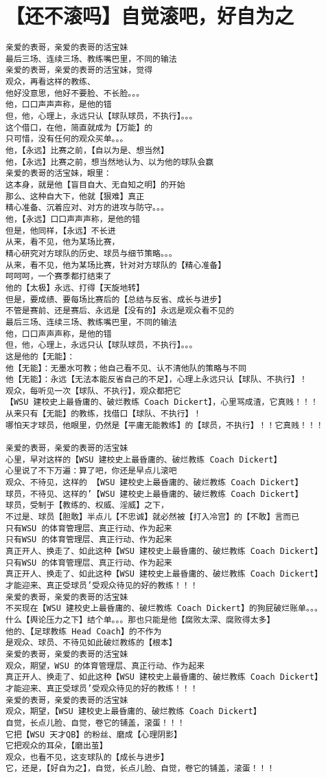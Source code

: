 \documentclass[9pt, b5paper]{article}
\begin{document}
\section{【还不滚吗】自觉滚吧，好自为之}
\label{sec-15}
\begin{verbatim}
亲爱的表哥，亲爱的表哥的活宝妹
最后三场、连续三场、教练嘴巴里，不同的输法
亲爱的表哥，亲爱的表哥的活宝妹，觉得
观众，再看这样的教练、
他好没意思，他好不要脸、不长脸。。。
他，口口声声声称，是他的错
但，他，心理上，永远只认【球队球员，不执行】。。。
这个借口，在他，简直就成为【万能】的
只可惜，没有任何的观众买单。。。
他，【永远】比赛之前，【自以为是、想当然】
他，【永远】比赛之前，想当然地认为、以为他的球队会赢
亲爱的表哥的活宝妹，眼里：
这本身，就是他【盲目自大、无自知之明】的开始
那么、这种自大下，他就【狠难】真正
精心准备、沉着应对、对方的进攻与防守。。。
他，【永远】口口声声声称，是他的错
但是，他同样，【永远】不长进
从来，看不见，他为某场比赛，
精心研究对方球队的历史、球员与细节策略。。。
从来，看不见，他为某场比赛，针对对方球队的【精心准备】
呵呵呵，一个赛季都打结束了
他的【太极】永远、打得【天旋地转】
但是，要成绩、要每场比赛后的【总结与反省、成长与进步】
不管是赛前、还是赛后、永远是【没有的】永远是观众看不见的
最后三场、连续三场、教练嘴巴里，不同的输法
他，口口声声声称，是他的错
但，他，心理上，永远只认【球队球员，不执行】。。。
这是他的【无能】：
他【无能】：无墨水可教；他自己看不见、认不清他队的策略与不同
他【无能】：永远【无法本能反省自己的不足】，心理上永远只认【球队、不执行】！
观众，每听见一次【球队、不执行】，观众都把它
【WSU 建校史上最昏庸的、破烂教练 Coach Dickert】，心里骂成渣，它真贱！！！
从来只有【无能】的教练，找借口【球队、不执行】！
哪怕天才球员，他眼里，仍然是【平庸无能教练】的【球员，不执行】！！它真贱！！！

亲爱的表哥，亲爱的表哥的活宝妹
心里，早对这样的【WSU 建校史上最昏庸的、破烂教练 Coach Dickert】
心里说了不下万遍：算了吧，你还是早点儿滚吧
观众、不待见，这样的 【WSU 建校史上最昏庸的、破烂教练 Coach Dickert】
球员，不待见、这样的’【WSU 建校史上最昏庸的、破烂教练 Coach Dickert】
球员，受制于【教练的、权威、淫威】之下，
不过是、球员【胆敢】半点儿【不忠诚】就必然被【打入冷宫】的【不敢】言而已
只有WSU 的体育管理层、真正行动、作为起来
只有WSU 的体育管理层、真正行动、作为起来
真正开人、换走了、如此这种【WSU 建校史上最昏庸的、破烂教练 Coach Dickert】
只有WSU 的体育管理层、真正行动、作为起来
真正开人、换走了、如此这种【WSU 建校史上最昏庸的、破烂教练 Coach Dickert】
才能迎来、真正受球员’受观众待见的好的教练！！！
亲爱的表哥，亲爱的表哥的活宝妹
不买现在【WSU 建校史上最昏庸的、破烂教练 Coach Dickert】的狗屁破烂账单。。。
什么【舆论压力之下】结个单。。。那也只能是他【腐败太深、腐败得太多】
他的、【足球教练 Head Coach】的不作为
是观众、球员、不待见如此破烂教练的【根本】
亲爱的表哥，亲爱的表哥的活宝妹
观众，期望，WSU 的体育管理层、真正行动、作为起来
真正开人、换走了、如此这种【WSU 建校史上最昏庸的、破烂教练 Coach Dickert】
才能迎来、真正受球员’受观众待见的好的教练！！！
亲爱的表哥，亲爱的表哥的活宝妹
观众，期望，【WSU 建校史上最昏庸的、破烂教练 Coach Dickert】
自觉，长点儿脸、自觉，卷它的铺盖，滚蛋！！！
它把【WSU 天才QB】的粉丝、磨成【心理阴影】
它把观众的耳朵，【磨出茧】
观众，也看不见，这支球队的【成长与进步】
它，还是，【好自为之】，自觉，长点儿脸、自觉，卷它的铺盖，滚蛋！！！


\end{verbatim}
\end{document}
